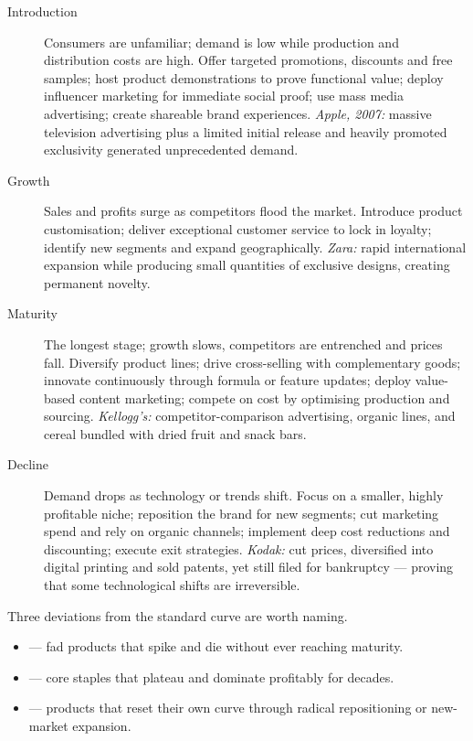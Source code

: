 \documentclass{MMTextbook}
\begin{document}
\begin{description}
\item[Introduction] Consumers are unfamiliar; demand is low while production and
distribution costs are high. Offer targeted promotions, discounts and free
samples; host product demonstrations to prove functional value; deploy influencer
marketing for immediate social proof; use mass media advertising; create
shareable brand experiences. \emph{Apple, 2007:} massive television advertising
plus a limited initial release and heavily promoted exclusivity generated
unprecedented demand.
\item[Growth] Sales and profits surge as competitors flood the market. Introduce
product customisation; deliver exceptional customer service to lock in loyalty;
identify new segments and expand geographically. \emph{Zara:} rapid
international expansion while producing small quantities of exclusive designs,
creating permanent novelty.
\item[Maturity] The longest stage; growth slows, competitors are entrenched and
prices fall. Diversify product lines; drive cross-selling with complementary
goods; innovate continuously through formula or feature updates; deploy
value-based content marketing; compete on cost by optimising production and
sourcing. \emph{Kellogg's:} competitor-comparison advertising, organic lines,
and cereal bundled with dried fruit and snack bars.
\item[Decline] Demand drops as technology or trends shift. Focus on a smaller,
highly profitable niche; reposition the brand for new segments; cut marketing
spend and rely on organic channels; implement deep cost reductions and
discounting; execute exit strategies. \emph{Kodak:} cut prices, diversified into
digital printing and sold patents, yet still filed for bankruptcy --- proving
that some technological shifts are irreversible.
\end{description}

Three deviations from the standard curve are worth naming.

\begin{itemize}
\item {} --- fad products that spike and die without ever reaching
      maturity.
\item {} --- core staples that plateau and dominate profitably
      for decades.
\item {} --- products that reset their own curve through radical
      repositioning or new-market expansion.
\end{itemize}
\end{document}
